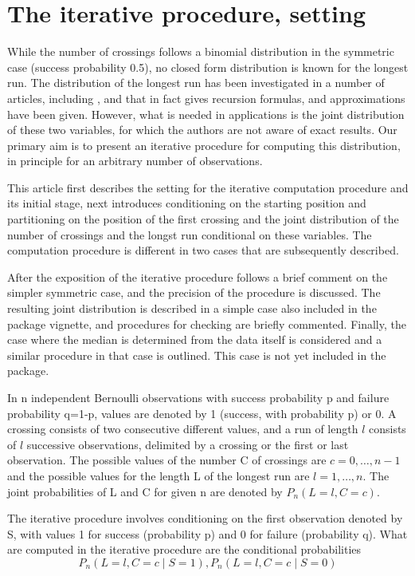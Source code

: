 \section{The iterative procedure, setting}

While the number of crossings follows a binomial distribution in the symmetric case (success probability 0.5), no closed form distribution is known for the longest run. The distribution of the longest run has been investigated in a number of articles, including \citep{Schilling:2012}, and \citep{Fazekas:2010} that in fact gives recursion formulas, and approximations have been given. However, what is needed in applications is the joint distribution of these two variables, for which the authors are not aware of exact results. Our primary aim is to present an iterative procedure for computing this distribution, in principle for an arbitrary number of observations.

This article first describes the setting for the iterative computation procedure and its initial stage, next introduces conditioning on the starting position and partitioning on the position of the first crossing and the joint distribution of the number of crossings and the longst run conditional on these variables. The computation procedure is different in two cases that are subsequently described. 

After the exposition of the iterative procedure follows a brief comment on the simpler symmetric case, and the precision of the procedure is discussed. The resulting joint distribution is described in a simple case also included in the package vignette, and procedures for checking are briefly commented. Finally, the case where the median is determined from the data itself is considered and a similar procedure in that case is outlined. This case is not yet included in the package.

In n independent Bernoulli observations with success probability p and failure probability q=1-p, values are denoted by 1 (success, with probability p) or 0. A crossing consists of two consecutive different values, and a run of length $l$ consists of $l$ successive observations, delimited by a crossing or the first or last observation. The possible values of the number C of crossings are $c=0, \ldots ,n-1$ and the possible values for the length L of the longest run are $l=1, \ldots ,n$. The joint probabilities of L and C for given n are denoted by $P_n (L=l,C=c)$.

The iterative procedure involves conditioning on the first observation denoted by S, with values 1 for success (probability p) and 0 for failure (probability q). What are computed in the iterative procedure are the conditional probabilities $$P_n (L=l,C=c \mid S=1), P_n (L=l,C=c \mid S=0)$$

